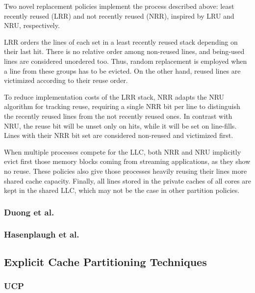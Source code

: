 Two novel replacement policies implement the process described above: least recently reused (LRR) and not recently reused (NRR), inspired by LRU and NRU, respectively. 

LRR orders the lines of each set in a least recently reused stack depending on their last hit. 
There is no relative order among non-reused lines, and being-used lines are considered unordered too. 
Thus, random replacement is employed when a line from these groups has to be evicted. 
On the other hand, reused lines are victimized according to their reuse order. 

To reduce implementation costs of the LRR stack, NRR adapts the NRU algorithm for tracking reuse, requiring a single NRR bit per line to distinguish the recently reused lines from the not recently reused ones.
In contrast with NRU, the reuse bit will be unset only on hits, while it will be set on line-fills. 
Lines with their NRR bit set are considered non-reused and victimized first.

When multiple processes compete for the LLC, both NRR and NRU implicitly evict first those memory blocks coming from streaming applications, as they show no reuse. 
These policies also give those processes heavily reusing their lines more shared cache capacity.
Finally, all lines stored in the private caches of all cores are kept in the shared LLC, which may not be the case in other partition policies.

\subsubsection{Duong et al.}


\subsubsection{Hasenplaugh et al.}


\subsection{Explicit Cache Partitioning Techniques}

\subsubsection{UCP}

